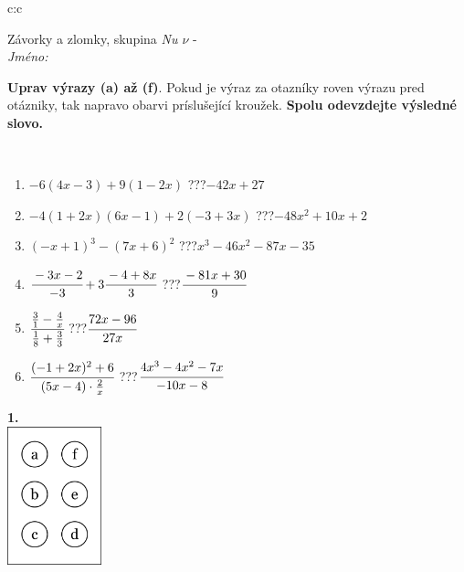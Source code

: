 \documentclass[10pt]{report}
\begin{document}
\begin{tabular}{c:c}
\begin{minipage}[c][104.5mm][t]{0.5\linewidth}
\begin{center}
\vspace{7mm}
{\huge Závorky a zlomky, skupina \textit{Nu $\nu$} -}\\[5mm]
\textit{Jméno:}\phantom{xxxxxxxxxxxxxxxxxxxxxxxxxxxxxxxxxxxxxxxxxxxxxxxxxxxxxxxxxxxxxxxxx}\\[5mm]
\begin{minipage}{0.95\linewidth}
\begin{center}
\textbf{Uprav výrazy (a) až (f)}. Pokud je výraz za otazníky roven výrazu pred otázniky, tak napravo obarvi príslušející kroužek. \textbf{Spolu odevzdejte výsledné slovo.}
\end{center}
\end{minipage}
\\[1mm]
\begin{minipage}{0.79\linewidth}
\begin{center}
\begin{varwidth}{\linewidth}
\begin{enumerate}
\normalsize
\item $-6(4x-3)+9(1-2x)$\quad \dotfill\; ???\;\dotfill \quad $-42x+27$
\item $-4(1+2x)(6x-1)+2(-3+3x)$\quad \dotfill\; ???\;\dotfill \quad $-48x^2+10x+2$
\item $(-x+1)^3-(7x+6)^2$\quad \dotfill\; ???\;\dotfill \quad $x^3-46x^2-87x-35$
\item $\cfrac{-3x-2}{-3}+3\cfrac{-4+8x}{3}$\quad \dotfill\; ???\;\dotfill \quad $\cfrac{-81x+30}{9}$
\item $\cfrac{\frac{3}{1}-\frac{4}{x}}{\frac{1}{8}+\frac{3}{3}}$\quad \dotfill\; ???\;\dotfill \quad $\cfrac{72x-96}{27x}$
\item $\cfrac{(-1+2x)^2+6}{(5x-4)\cdot\frac{2}{x}}$\quad \dotfill\; ???\;\dotfill \quad $\cfrac{4x^3-4x^2-7x}{-10x-8}$
\end{enumerate}
\end{varwidth}
\end{center}
\end{minipage}
\begin{minipage}{0.20\linewidth}
\begin{center}
{\Huge\bfseries 1.} \\[2mm]
\includegraphics[height=40mm]{../images/braille.png}

\end{center}
\end{minipage}
\end{center}
\end{minipage}
\end{tabular}
\end{document}
